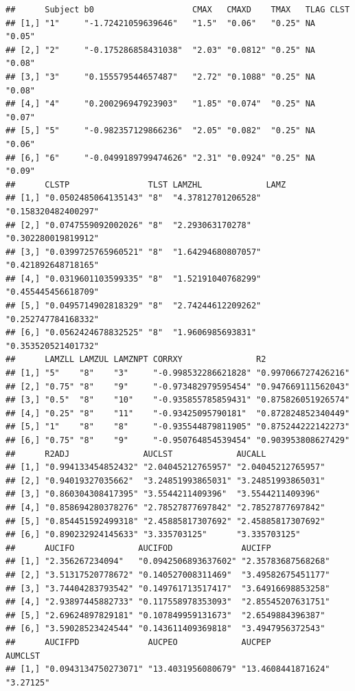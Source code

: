 \documentclass[12pt,]{krantz}
\theoremstyle{definition}
\theoremstyle{definition}
\theoremstyle{definition}
\theoremstyle{remark}
\begin{document}
\begin{verbatim}
##      Subject b0                    CMAX   CMAXD    TMAX   TLAG CLST  
## [1,] "1"     "-1.72421059639646"   "1.5"  "0.06"   "0.25" NA   "0.05"
## [2,] "2"     "-0.175286858431038"  "2.03" "0.0812" "0.25" NA   "0.08"
## [3,] "3"     "0.155579544657487"   "2.72" "0.1088" "0.25" NA   "0.08"
## [4,] "4"     "0.200296947923903"   "1.85" "0.074"  "0.25" NA   "0.07"
## [5,] "5"     "-0.982357129866236"  "2.05" "0.082"  "0.25" NA   "0.06"
## [6,] "6"     "-0.0499189799474626" "2.31" "0.0924" "0.25" NA   "0.09"
##      CLSTP                TLST LAMZHL             LAMZ               
## [1,] "0.0502485064135143" "8"  "4.37812701206528" "0.158320482400297"
## [2,] "0.0747559092002026" "8"  "2.293063170278"   "0.302280019819912"
## [3,] "0.0399725765960521" "8"  "1.64294680807057" "0.421892648718165"
## [4,] "0.0319601103599335" "8"  "1.52191040768299" "0.455445456618709"
## [5,] "0.0495714902818329" "8"  "2.74244612209262" "0.252747784168332"
## [6,] "0.0562424678832525" "8"  "1.9606985693831"  "0.353520521401732"
##      LAMZLL LAMZUL LAMZNPT CORRXY               R2                 
## [1,] "5"    "8"    "3"     "-0.998532286621828" "0.997066727426216"
## [2,] "0.75" "8"    "9"     "-0.973482979595454" "0.947669111562043"
## [3,] "0.5"  "8"    "10"    "-0.935855785859431" "0.875826051926574"
## [4,] "0.25" "8"    "11"    "-0.93425095790181"  "0.872824852340449"
## [5,] "1"    "8"    "8"     "-0.935544879811905" "0.875244222142273"
## [6,] "0.75" "8"    "9"     "-0.950764854539454" "0.903953808627429"
##      R2ADJ               AUCLST             AUCALL            
## [1,] "0.994133454852432" "2.04045212765957" "2.04045212765957"
## [2,] "0.94019327035662"  "3.24851993865031" "3.24851993865031"
## [3,] "0.860304308417395" "3.5544211409396"  "3.5544211409396" 
## [4,] "0.858694280378276" "2.78527877697842" "2.78527877697842"
## [5,] "0.854451592499318" "2.45885817307692" "2.45885817307692"
## [6,] "0.890232924145633" "3.335703125"      "3.335703125"     
##      AUCIFO             AUCIFOD              AUCIFP            
## [1,] "2.356267234094"   "0.0942506893637602" "2.35783687568268"
## [2,] "3.51317520778672" "0.140527008311469"  "3.49582675451177"
## [3,] "3.74404283793542" "0.149761713517417"  "3.64916698853258"
## [4,] "2.93897445882733" "0.117558978353093"  "2.85545207631751"
## [5,] "2.69624897829181" "0.107849959131673"  "2.6549884396387" 
## [6,] "3.59028523424544" "0.143611409369818"  "3.4947956372543" 
##      AUCIFPD              AUCPEO             AUCPEP             AUMCLST   
## [1,] "0.0943134750273071" "13.4031956080679" "13.4608441871624" "3.27125" 

\end{verbatim}
\end{document}

